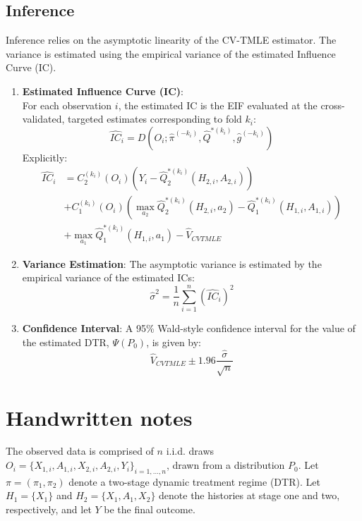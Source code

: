 \documentclass{article}
\begin{document}
\subsection{Inference}
Inference relies on the asymptotic linearity of the CV-TMLE estimator. The variance is estimated using the empirical variance of the estimated Influence Curve (IC).
\begin{enumerate}
	\item \textbf{Estimated Influence Curve (IC)}: \\
	      For each observation $i$, the estimated IC is the EIF evaluated at the cross-validated, targeted estimates corresponding to fold $k_i$:
	      $$ \widehat{IC}_i = D(O_i; \widehat{\pi}^{(-k_i)}, \widehat{Q}^{*(k_i)}, \widehat{g}^{(-k_i)}) $$
	      Explicitly:
	      $$
		      \begin{aligned}
			      \widehat{IC}_i & = C_2^{(k_i)}(O_i)\left(Y_i - \widehat{Q}_2^{*(k_i)}(H_{2,i}, A_{2,i})\right)                                            \\
			                     & + C_1^{(k_i)}(O_i)\left(\max_{a_2}\widehat{Q}_2^{*(k_i)}(H_{2,i}, a_2) - \widehat{Q}_1^{*(k_i)}(H_{1,i}, A_{1,i})\right) \\
			                     & + \max_{a_1}\widehat{Q}_1^{*(k_i)}(H_{1,i}, a_1) - \widehat{V}_{CVTMLE}
		      \end{aligned}
	      $$

	\item \textbf{Variance Estimation}: The asymptotic variance is estimated by the empirical variance of the estimated ICs:
	      $$ \widehat{\sigma}^2 = \frac{1}{n} \sum_{i=1}^n (\widehat{IC}_i)^2 $$

	\item \textbf{Confidence Interval}: A 95\% Wald-style confidence interval for the value of the estimated DTR, $\Psi(P_0)$, is given by:
	      $$ \widehat{V}_{CVTMLE} \pm 1.96 \frac{\widehat{\sigma}}{\sqrt{n}} $$
\end{enumerate}

\iffalse
	\section{Handwritten notes}

	The observed data is comprised of \(n\) i.i.d. draws \(O_i = \{X_{1,i}, A_{1,i}, X_{2,i}, A_{2,i}, Y_i\}_{i=1,\dots,n}\), drawn from a distribution \(P_0\). Let \(\pi = (\pi_1, \pi_2)\) denote a two-stage dynamic treatment regime (DTR). Let \(H_1 = \{X_1\}\) and \(H_2 = \{X_1, A_1, X_2\}\) denote the histories at stage one and two, respectively, and let \(Y\) be the final outcome.
\end{document}
